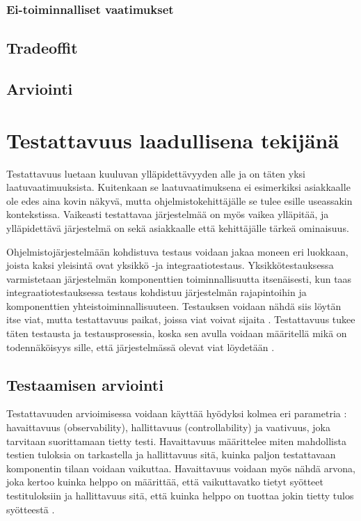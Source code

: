 \documentclass[finnish]{tktltiki2}
\theoremstyle{definition}
\theoremstyle{remark}
\begin{document}
\subsubsection{Ei-toiminnalliset vaatimukset}
\subsection{Tradeoffit}
\subsection{Arviointi}


\section{Testattavuus laadullisena tekijänä}
Testattavuus luetaan kuuluvan ylläpidettävyyden alle \citep{ISO/IEC25010:2011} ja on täten yksi laatuvaatimuuksista. Kuitenkaan se laatuvaatimuksena ei esimerkiksi asiakkaalle ole edes aina kovin näkyvä, mutta ohjelmistokehittäjälle se tulee esille useassakin kontekstissa. Vaikeasti testattavaa järjestelmää on myös vaikea ylläpitää, ja ylläpidettävä järjestelmä on sekä asiakkaalle että kehittäjälle tärkeä ominaisuus.

Ohjelmistojärjestelmään kohdistuva testaus voidaan jakaa moneen eri luokkaan, joista kaksi yleisintä ovat yksikkö -ja integraatiotestaus. Yksikkötestauksessa varmistetaan järjestelmän komponenttien toiminnallisuutta itsenäisesti, kun taas integraatiotestauksessa testaus kohdistuu järjestelmän rajapintoihin ja komponenttien yhteistoiminnallisuuteen. Testauksen voidaan nähdä siis löytän itse viat, mutta testattavuus paikat, joissa viat voivat sijaita \citep[s. 19]{Voas:1995:STN:624607.625469}. Testattavuus tukee täten testausta ja testausprosessia, koska sen avulla voidaan määritellä mikä on todennäköisyys sille, että järjestelmässä olevat viat löydetään \citep[s. 114]{voas_improving_1992}. 


\subsection{Testaamisen arviointi}

Testattavuuden arvioimisessa voidaan käyttää hyödyksi kolmea eri parametria \citep[s. 2]{baudry_measuring_2003}: havaittavuus (observability), hallittavuus (controllability) ja vaativuus, joka tarvitaan suorittamaan tietty testi. Havaittavuus määrittelee miten mahdollista testien tuloksia on tarkastella ja hallittavuus sitä, kuinka paljon testattavaan komponentin tilaan voidaan vaikuttaa. Havaittavuus voidaan myös nähdä arvona, joka kertoo kuinka helppo on määrittää, että vaikuttavatko tietyt syötteet testituloksiin ja hallittavuus sitä, että kuinka helppo on tuottaa jokin tietty tulos syötteestä \citep[s. 554]{Freedman:1991:TSC:126218.126229}. 
\end{document}
